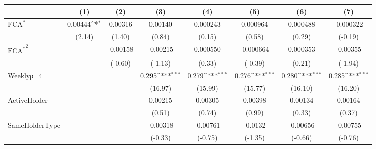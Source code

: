 {
\def\sym#1{\ifmmode^{#1}\else\(^{#1}\)\fi}
\begin{tabular}{l*{7}{c}}
\hline\hline
                    &\multicolumn{1}{c}{(1)}         &\multicolumn{1}{c}{(2)}         &\multicolumn{1}{c}{(3)}         &\multicolumn{1}{c}{(4)}         &\multicolumn{1}{c}{(5)}         &\multicolumn{1}{c}{(6)}         &\multicolumn{1}{c}{(7)}         \\
\hline
$ \text{FCA}^* $    &     0.00444\sym{*}  &     0.00316         &     0.00140         &    0.000243         &    0.000964         &    0.000488         &   -0.000322         \\
                    &      (2.14)         &      (1.40)         &      (0.84)         &      (0.15)         &      (0.58)         &      (0.29)         &     (-0.19)         \\
[1em]
 $ { \text{FCA} ^ * } ^2 $&                     &    -0.00158         &    -0.00215         &    0.000550         &   -0.000664         &    0.000353         &    -0.00355         \\
                    &                     &     (-0.60)         &     (-1.13)         &      (0.33)         &     (-0.39)         &      (0.21)         &     (-1.94)         \\
[1em]
Weeklyρ\_4           &                     &                     &       0.295\sym{***}&       0.279\sym{***}&       0.276\sym{***}&       0.280\sym{***}&       0.285\sym{***}\\
                    &                     &                     &     (16.97)         &     (15.99)         &     (15.77)         &     (16.10)         &     (16.20)         \\
[1em]
ActiveHolder        &                     &                     &     0.00215         &     0.00305         &     0.00398         &     0.00134         &     0.00164         \\
                    &                     &                     &      (0.51)         &      (0.74)         &      (0.99)         &      (0.33)         &      (0.37)         \\
[1em]
SameHolderType      &                     &                     &    -0.00318         &    -0.00761         &     -0.0132         &    -0.00656         &    -0.00755         \\
                    &                     &                     &     (-0.33)         &     (-0.75)         &     (-1.35)         &     (-0.66)         &     (-0.76)         \\

\end{tabular}}
